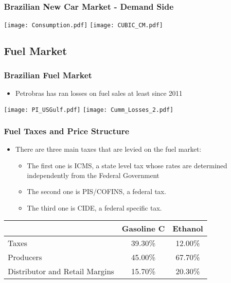 \documentclass{beamer}
\begin{document}
\begin{frame}[fragile]\frametitle{Brazilian New Car Market - Demand Side}
    
\texttt{[image: Consumption.pdf]}%
\texttt{[image: CUBIC\_CM.pdf]}


\end{frame}

\subsection{Fuel Market}

\begin{frame}[fragile]\frametitle{Brazilian Fuel Market}

\begin{itemize}
    \item Petrobras has ran losses on fuel sales at least since 2011
\end{itemize}
    
\texttt{[image: PI\_USGulf.pdf]}%
\texttt{[image: Cumm\_Losses\_2.pdf]}


\end{frame}

\begin{frame}[fragile]\frametitle{Fuel Taxes and Price Structure}
    \begin{itemize}
        \item There are three main taxes that are levied on the fuel market: 
        \begin{itemize}
            \item The first one is ICMS, a state level tax whose rates are determined independently from the Federal Government 
            \item The second one is PIS/COFINS, a federal tax. 
            \item The third one is CIDE, a federal specific tax.
        \end{itemize}
        
    \end{itemize}

    \begin{tabular}{lcc}
    \toprule
          & Gasoline C & Ethanol \\
    \midrule
    Taxes & 39.30\% & 12.00\% \\
    Producers & 45.00\% & 67.70\% \\
    Distributor and Retail Margins & 15.70\% & 20.30\% \\
    \bottomrule
    \end{tabular}%


\end{frame}
\end{document}

